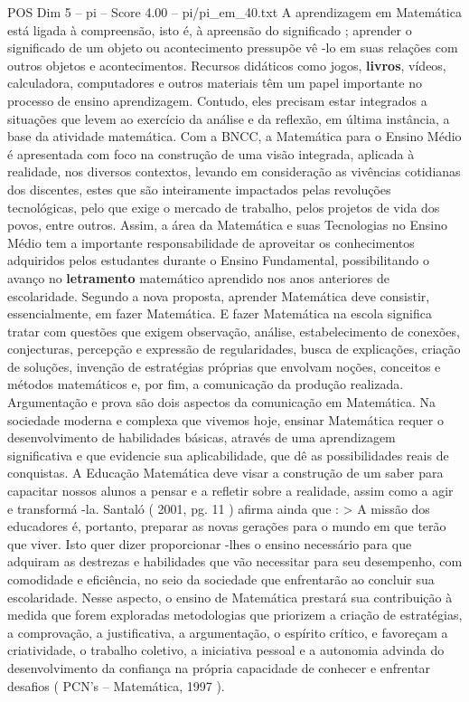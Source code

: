 \begin{textsample}{POS Dim 5 – pi – Score 4.00 – pi/pi\_em\_40.txt}
A aprendizagem em Matemática está ligada à compreensão, isto é, à apreensão do significado ; aprender o significado de um objeto ou acontecimento pressupõe vê -lo em suas relações com outros objetos e acontecimentos.
Recursos didáticos como jogos, \textbf{livros}, vídeos, calculadora, computadores e outros materiais têm um papel importante no processo de ensino aprendizagem.
Contudo, eles precisam estar integrados a situações que levem ao exercício da análise e da reflexão, em última instância, a base da atividade matemática.
Com a BNCC, a Matemática para o Ensino Médio é apresentada com foco na construção de uma visão integrada, aplicada à realidade, nos diversos contextos, levando em consideração as vivências cotidianas dos discentes, estes que são inteiramente impactados pelas revoluções tecnológicas, pelo que exige o mercado de trabalho, pelos projetos de vida dos povos, entre outros.
Assim, a área da Matemática e suas Tecnologias no Ensino Médio tem a importante responsabilidade de aproveitar os conhecimentos adquiridos pelos estudantes durante o Ensino Fundamental, possibilitando o avanço no \textbf{letramento} matemático aprendido nos anos anteriores de escolaridade.
Segundo a nova proposta, aprender Matemática deve consistir, essencialmente, em fazer Matemática.
E fazer Matemática na escola significa tratar com questões que exigem observação, análise, estabelecimento de conexões, conjecturas, percepção e expressão de regularidades, busca de explicações, criação de soluções, invenção de estratégias próprias que envolvam noções, conceitos e métodos matemáticos e, por fim, a comunicação da produção realizada.
Argumentação e prova são dois aspectos da comunicação em Matemática.
Na sociedade moderna e complexa que vivemos hoje, ensinar Matemática requer o desenvolvimento de habilidades básicas, através de uma aprendizagem significativa e que evidencie sua aplicabilidade, que dê as possibilidades reais de conquistas.
A Educação Matemática deve visar a construção de um saber para capacitar nossos alunos a pensar e a refletir sobre a realidade, assim como a agir e transformá -la.
Santaló ( 2001, pg. 11 ) afirma ainda que : > A missão dos educadores é, portanto, preparar as novas gerações para o mundo em que terão que viver.
Isto quer dizer proporcionar -lhes o ensino necessário para que adquiram as destrezas e habilidades que vão necessitar para seu desempenho, com comodidade e eficiência, no seio da sociedade que enfrentarão ao concluir sua escolaridade.
Nesse aspecto, o ensino de Matemática prestará sua contribuição à medida que forem exploradas metodologias que priorizem a criação de estratégias, a comprovação, a justificativa, a argumentação, o espírito crítico, e favoreçam a criatividade, o trabalho coletivo, a iniciativa pessoal e a autonomia advinda do desenvolvimento da confiança na própria capacidade de conhecer e enfrentar desafios ( PCN’s – Matemática, 1997 ).

\end{textsample}
